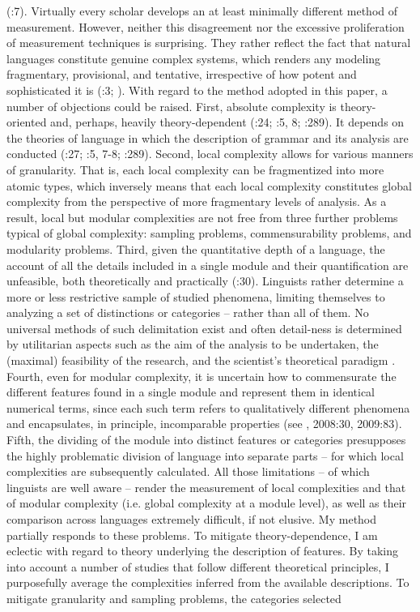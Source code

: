 \documentclass[output=paper]{langscibook}
\begin{document}
\begin{enumerate}
(\citealt{NewmeyerPreston2014}:7). Virtually every scholar develops an at least minimally different method of measurement. However, neither this disagreement nor the excessive proliferation of measurement techniques is surprising. They rather reflect the fact that natural languages constitute genuine complex systems, which renders any modeling fragmentary, provisional, and tentative, irrespective of how potent and sophisticated it is (\citealt{CilliersEtAl2013}:3; \citealt{Andrason2016}). With regard to the method adopted in this paper, a number of objections could be raised. First, absolute complexity is theory-oriented and, perhaps, heavily theory-dependent (\citealt{Miestamo2008}:24; \citealt{Kusters2008}:5, 8; \citealt{Hammarström2008}:289). It depends on the theories of language in which the description of grammar and its analysis are conducted (\citealt{Miestamo2008}:27; \citealt{Kusters2008}:5, 7-8; \citealt{Hammarström2008}:289). Second, local complexity allows for various manners of granularity. That is, each local complexity can be fragmentized into more atomic types, which inversely means that each local complexity constitutes global complexity from the perspective of more fragmentary levels of analysis. As a result, local but modular complexities are not free from three further problems typical of global complexity: sampling problems, commensurability problems, and modularity problems. Third, given the quantitative depth of a language, the account of all the details included in a single module and their quantification are unfeasible, both theoretically and practically (\citealt{Miestamo2006b,20082006b}:30). Linguists rather determine a more or less restrictive sample of studied phenomena, limiting themselves to analyzing a set of distinctions or categories – rather than all of them. No universal methods of such delimitation exist and often detail-ness is determined by utilitarian aspects such as the aim of the analysis to be undertaken, the (maximal) feasibility of the research, and the scientist’s theoretical paradigm \citep[248]{Deutscher2009}. Fourth, even for modular complexity, it is uncertain how to commensurate the different features found in a single module and represent them in identical numerical terms, since each such term refers to qualitatively different phenomena and encapsulates, in principle, incomparable properties (see \citealt{Miestamo2006a,2006b2006a}, 2008:30, 2009:83). Fifth, the dividing of the module into distinct features or categories presupposes the highly problematic division of language into separate parts – for which local complexities are subsequently calculated. All those limitations – of which linguists are well aware – render the measurement of local complexities and that of modular complexity (i.e. global complexity at a module level), as well as their comparison across languages extremely difficult, if not elusive. My method partially responds to these problems. To mitigate theory-dependence, I am eclectic with regard to theory underlying the description of features. By taking into account a number of studies that follow different theoretical principles, I purposefully average the complexities inferred from the available descriptions. To mitigate granularity and sampling problems, the categories selected 
\end{enumerate}
\end{document}
